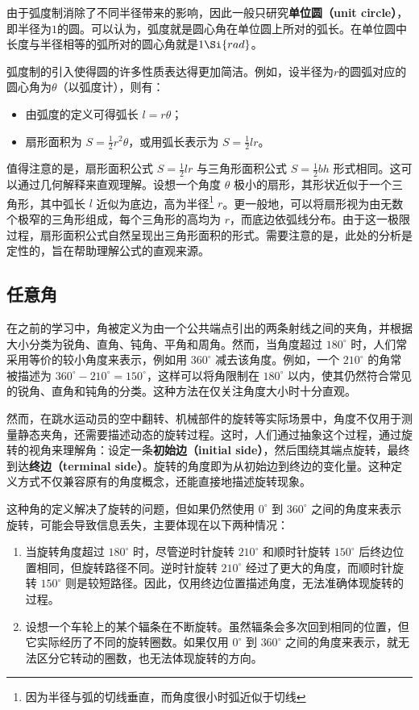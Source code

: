 由于弧度制消除了不同半径带来的影响，因此一般只研究\textbf{单位圆（unit circle）}，即半径为$1$的圆。可以认为，弧度就是圆心角在单位圆上所对的弧长。在单位圆中长度与半径相等的弧所对的圆心角就是$1 \Si{rad}$。

弧度制的引入使得圆的许多性质表达得更加简洁。例如，设半径为$r$的圆弧对应的圆心角为$\theta$（以弧度计），则有：
\begin{itemize}
\item 由弧度的定义可得弧长 $l = r\theta$；
\item 扇形面积为 $\displaystyle S = \frac{1}{2} r^2 \theta$，或用弧长表示为 $\displaystyle S = \frac{1}{2} l r$。
\end{itemize}

值得注意的是，扇形面积公式 $\displaystyle S = \frac{1}{2} l r$ 与三角形面积公式 $\displaystyle S = \frac{1}{2} bh$ 形式相同。这可以通过几何解释来直观理解。设想一个角度 $\theta$ 极小的扇形，其形状近似于一个三角形，其中弧长 $l$ 近似为底边，高为半径\footnote{因为半径与弧的切线垂直，而角度很小时弧近似于切线} $r$。更一般地，可以将扇形视为由无数个极窄的三角形组成，每个三角形的高均为 $r$，而底边依弧线分布。由于这一极限过程，扇形面积公式自然呈现出三角形面积的形式。需要注意的是，此处的分析是定性的，旨在帮助理解公式的直观来源。


\subsection{任意角}

在之前的学习中，角被定义为由一个公共端点引出的两条射线之间的夹角，并根据大小分类为锐角、直角、钝角、平角和周角。然而，当角度超过 $180^\circ$ 时，人们常采用等价的较小角度来表示，例如用 $360^\circ$ 减去该角度。例如，一个 $210^\circ$ 的角常被描述为 $360^\circ - 210^\circ = 150^\circ$，这样可以将角限制在 $180^\circ$ 以内，使其仍然符合常见的锐角、直角和钝角的分类。这种方法在仅关注角度大小时十分直观。

然而，在跳水运动员的空中翻转、机械部件的旋转等实际场景中，角度不仅用于测量静态夹角，还需要描述动态的旋转过程。这时，人们通过抽象这个过程，通过旋转的视角来理解角：设定一条\textbf{初始边（initial side）}，然后围绕其端点旋转，最终到达\textbf{终边（terminal side）}。旋转的角度即为从初始边到终边的变化量。这种定义方式不仅兼容原有的角度概念，还能直接地描述旋转现象。

这种角的定义解决了旋转的问题，但如果仍然使用 $0^\circ$ 到 $360^\circ$ 之间的角度来表示旋转，可能会导致信息丢失，主要体现在以下两种情况：
\begin{enumerate}
\item 当旋转角度超过 $180^\circ$ 时，尽管逆时针旋转 $210^\circ$ 和顺时针旋转 $150^\circ$ 后终边位置相同，但旋转路径不同。逆时针旋转 $210^\circ$ 经过了更大的角度，而顺时针旋转 $150^\circ$ 则是较短路径。因此，仅用终边位置描述角度，无法准确体现旋转的过程。
\item 设想一个车轮上的某个辐条在不断旋转。虽然辐条会多次回到相同的位置，但它实际经历了不同的旋转圈数。如果仅用 $0^\circ$ 到 $360^\circ$ 之间的角度来表示，就无法区分它转动的圈数，也无法体现旋转的方向。
\end{enumerate}

